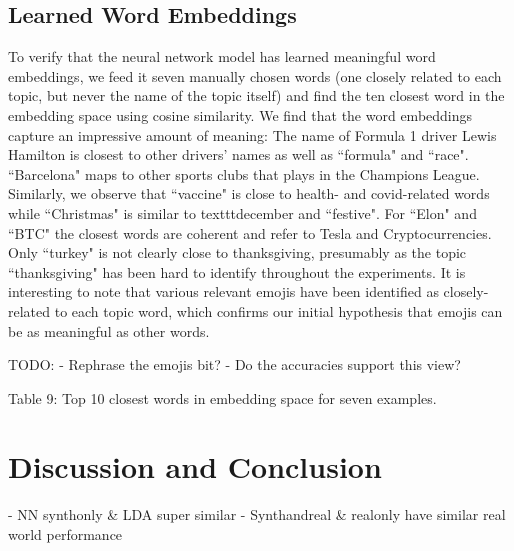 \documentclass[11pt]{article}
\begin{document}
\subsection{Learned Word Embeddings}
To verify that the neural network model has learned meaningful word embeddings, we feed it seven manually chosen words (one closely related to each topic, but never the name of the topic itself) and find the ten closest word in the embedding space using cosine similarity. We find that the word embeddings capture an impressive amount of meaning: The name of Formula 1 driver Lewis Hamilton is closest to other drivers' names as well as ``formula" and ``race". ``Barcelona" maps to other sports clubs that plays in the Champions League. Similarly,  we observe that ``vaccine" is close to health- and covid-related words while ``Christmas" is similar to texttt{december} and ``festive". For ``Elon" and ``BTC" the closest words are coherent and refer to Tesla and Cryptocurrencies. Only ``turkey" is not clearly close to thanksgiving, presumably as the topic ``thanksgiving" has been hard to identify throughout the experiments. It is interesting to note that various relevant emojis have been identified as closely-related to each topic word, which confirms our initial hypothesis that emojis can be as meaningful as other words.

TODO:
- Rephrase the emojis bit?
- Do the accuracies support this view?


\begin{adjustbox}{width=\columnwidth,center}

\end{adjustbox}
\begin{center}
	Table 9: Top 10 closest words in embedding space for seven examples.
\end{center}

\section{Discussion and Conclusion}
- NN synthonly \& LDA super similar
- Synthandreal \& realonly have similar real world performance




\newpage
\printbibliography
\end{document}
